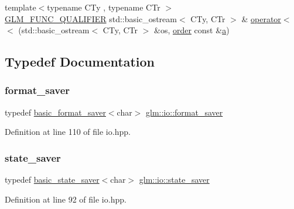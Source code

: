 \begin{DoxyCompactItemize}
\item 
{\footnotesize template$<$typename C\+Ty , typename C\+Tr $>$ }\\\mbox{\hyperlink{setup_8hpp_a33fdea6f91c5f834105f7415e2a64407}{G\+L\+M\+\_\+\+F\+U\+N\+C\+\_\+\+Q\+U\+A\+L\+I\+F\+I\+ER}} std\+::basic\+\_\+ostream$<$ C\+Ty, C\+Tr $>$ \& \mbox{\hyperlink{namespaceglm_1_1io_a4dab7c825ecbd918643ed9fc9ef4ecb6}{operator$<$$<$}} (std\+::basic\+\_\+ostream$<$ C\+Ty, C\+Tr $>$ \&os, \mbox{\hyperlink{structglm_1_1io_1_1order}{order}} const \&\mbox{\hyperlink{glad_8h_ac8729153468b5dcf13f971b21d84d4e5}{a}})
\end{DoxyCompactItemize}


\subsection{Typedef Documentation}
\mbox{\label{namespaceglm_1_1io_afdc168a994ef9e9ca4295578e9097495}} 
\subsubsection{\texorpdfstring{format\_saver}{format\_saver}}
{\footnotesize\ttfamily typedef \mbox{\hyperlink{classglm_1_1io_1_1basic__format__saver}{basic\+\_\+format\+\_\+saver}}$<$char$>$ \mbox{\hyperlink{namespaceglm_1_1io_afdc168a994ef9e9ca4295578e9097495}{glm\+::io\+::format\+\_\+saver}}}



Definition at line 110 of file io.\+hpp.

\mbox{\label{namespaceglm_1_1io_a84d63ac771c3125d38f144dc15234764}} 
\subsubsection{\texorpdfstring{state\_saver}{state\_saver}}
{\footnotesize\ttfamily typedef \mbox{\hyperlink{classglm_1_1io_1_1basic__state__saver}{basic\+\_\+state\+\_\+saver}}$<$char$>$ \mbox{\hyperlink{namespaceglm_1_1io_a84d63ac771c3125d38f144dc15234764}{glm\+::io\+::state\+\_\+saver}}}



Definition at line 92 of file io.\+hpp.

